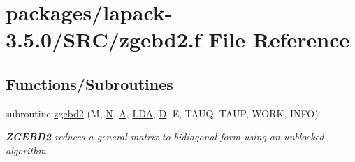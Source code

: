 \hypertarget{zgebd2_8f}{}\section{packages/lapack-\/3.5.0/\+S\+R\+C/zgebd2.f File Reference}
\label{zgebd2_8f}
\subsection*{Functions/\+Subroutines}
\begin{DoxyCompactItemize}
\item 
subroutine \hyperlink{group__complex16GEcomputational_gad5a784fc93cbf57b6b8ff3f0ff229cbe}{zgebd2} (M, \hyperlink{polmisc_8c_a0240ac851181b84ac374872dc5434ee4}{N}, \hyperlink{classA}{A}, \hyperlink{example__user_8c_ae946da542ce0db94dced19b2ecefd1aa}{L\+D\+A}, \hyperlink{odrpack_8h_a7dae6ea403d00f3687f24a874e67d139}{D}, E, T\+A\+U\+Q, T\+A\+U\+P, W\+O\+R\+K, I\+N\+F\+O)
\begin{DoxyCompactList}\small\item\em {\bfseries Z\+G\+E\+B\+D2} reduces a general matrix to bidiagonal form using an unblocked algorithm. \end{DoxyCompactList}\end{DoxyCompactItemize}
